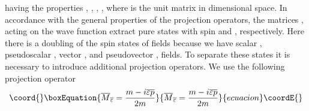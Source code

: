 \documentclass[a4paper,12pt]{article}
\begin{document}
having the properties \coordHE{}, \coordHE{}, \coordHE{}, \coordHE{}, where \coordHE{}
is the unit matrix in \coordHE{} dimensional space. In accordance with
the general properties of the projection operators, the matrices
\coordHE{}, \coordHE{} acting on the wave function extract pure
states with spin \coordHE{} and \coordHE{}, respectively. Here there is a
doubling of the spin states of fields because we have scalar \coordHE{}, pseudoscalar \coordHE{}, vector \myHighlight{$\psi _\mu $}\coordHE{},
and pseudovector \myHighlight{$\widetilde{\psi }_\mu $}\coordHE{}, fields. To separate
these states it is necessary to introduce additional projection
operators. We use the following projection operator
\begin{equation}\coord{}\boxEquation{
\overline{M}_{\overline{\varepsilon
}}=\frac{m-i\overline{\varepsilon } \overline{p}}{2m}  \label{32}
}{
\overline{M}_{\overline{\varepsilon
}}=\frac{m-i\overline{\varepsilon } \overline{p}}{2m}  }{ecuacion}\coordE{}\end{equation}
\end{document}
